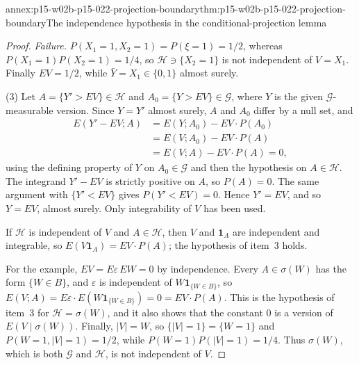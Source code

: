 \begin{annexitem}{annex:p15-w02b-p15-022-projection-boundary}{thm:p15-w02b-p15-022-projection-boundary}{The independence hypothesis in the conditional-projection lemma}
\begin{proof}
\emph{Failure.} \(P(X_1=1,X_2=1)=P(\xi=1)=1/2\), whereas
\(P(X_1=1)P(X_2=1)=1/4\), so \(\mathcal H\ni\{X_2=1\}\) is not independent
of \(V=X_1\). Finally \(EV=1/2\), while \(\bar Y=X_1\in\{0,1\}\) almost
surely.

(3) Let \(A=\{Y'>EV\}\in\mathcal H\) and \(A_0=\{Y>EV\}\in\mathcal G\),
where \(Y\) is the given \(\mathcal G\)-measurable version. Since
\(Y=Y'\) almost surely, \(A\) and \(A_0\) differ by a null set, and
\[
 \begin{aligned}
 E(Y'-EV;A)&=E(Y;A_0)-EV\cdot P(A_0)\\
   &=E(V;A_0)-EV\cdot P(A)\\
   &=E(V;A)-EV\cdot P(A)=0,
 \end{aligned}
\]
using the defining property of \(Y\) on \(A_0\in\mathcal G\) and then the
hypothesis on \(A\in\mathcal H\). The integrand \(Y'-EV\) is strictly
positive on \(A\), so \(P(A)=0\). The same argument with
\(\{Y'<EV\}\) gives \(P(Y'<EV)=0\). Hence \(Y'=EV\), and so \(Y=EV\),
almost surely. Only integrability of \(V\) has been used.

If \(\mathcal H\) is independent of \(V\) and \(A\in\mathcal H\), then
\(V\) and \(\mathbf1_A\) are independent and integrable, so
\(E(V\mathbf1_A)=EV\cdot P(A)\); the hypothesis of item~3 holds.

For the example, \(EV=E\varepsilon\,EW=0\) by independence. Every
\(A\in\sigma(W)\) has the form \(\{W\in B\}\), and \(\varepsilon\) is
independent of \(W\mathbf1_{\{W\in B\}}\), so
\(E(V;A)=E\varepsilon\cdot E(W\mathbf1_{\{W\in B\}})=0=EV\cdot P(A)\). This
is the hypothesis of item~3 for \(\mathcal H=\sigma(W)\), and it also shows
that the constant \(0\) is a version of \(E(V\mid\sigma(W))\). Finally,
\(|V|=W\), so \(\{|V|=1\}=\{W=1\}\) and
\(P(W=1,|V|=1)=1/2\), while \(P(W=1)P(|V|=1)=1/4\). Thus \(\sigma(W)\),
which is both \(\mathcal G\) and \(\mathcal H\), is not independent of
\(V\).
\end{proof}
\end{annexitem}

